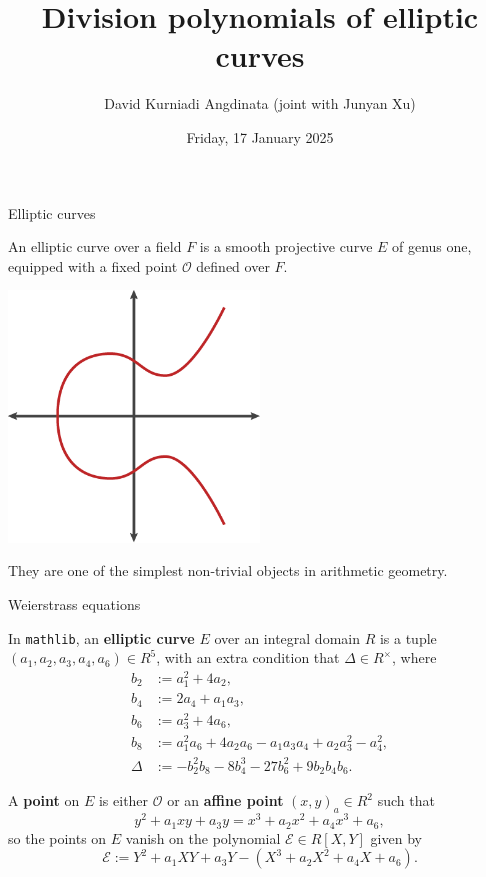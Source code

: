 \documentclass[10pt]{beamer}
\title{Division polynomials of elliptic curves}
\author{David Kurniadi Angdinata (joint with Junyan Xu)}
\institute{London School of Geometry and Number Theory}
\date{Friday, 17 January 2025}
\begin{document}
\frame{\titlepage}

\begin{frame}[t]{Elliptic curves}

An elliptic curve over a field $ F $ is a smooth projective curve $ E $ of genus one, equipped with a fixed point $ \mathcal{O} $ defined over $ F $.

\begin{center}
\includegraphics[width=0.5\textwidth]{ellipticcurves.png}
\end{center}

They are one of the simplest non-trivial objects in arithmetic geometry.

\end{frame}

\begin{frame}[t]{Weierstrass equations}

In \texttt{mathlib}, an \textbf{elliptic curve} $ E $ over an integral domain $ R $ is a tuple $ (a_1, a_2, a_3, a_4, a_6) \in R^5 $, with an extra condition that $ \Delta \in R^\times $, where
\begin{align*}
b_2 & := a_1^2 + 4a_2, \\
b_4 & := 2a_4 + a_1a_3, \\
b_6 & := a_3^2 + 4a_6, \\
b_8 & := a_1^2a_6 + 4a_2a_6 - a_1a_3a_4 + a_2a_3^2 - a_4^2, \\
\Delta & := -b_2^2b_8 - 8b_4^3 - 27b_6^2 + 9b_2b_4b_6.
\end{align*}

\pause

A \textbf{point} on $ E $ is either $ \mathcal{O} $ or an \textbf{affine point} $ (x, y)_a \in R^2 $ such that
$$ y^2 + a_1xy + a_3y = x^3 + a_2x^2 + a_4x^3 + a_6, $$
so the points on $ E $ vanish on the polynomial $ \mathcal{E} \in R[X, Y] $ given by
$$ \mathcal{E} := Y^2 + a_1XY + a_3Y - (X^3 + a_2X^2 + a_4X + a_6). $$

\end{frame}
\end{document}
